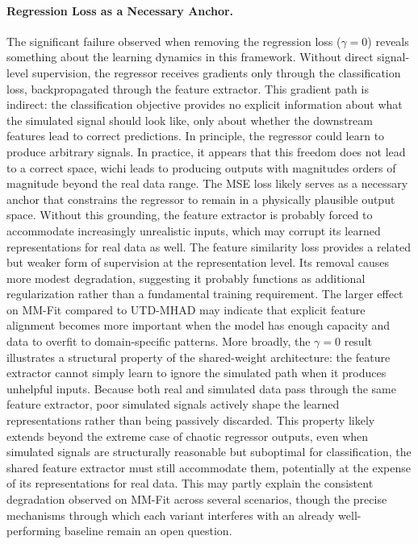 \paragraph{Regression Loss as a Necessary Anchor.}
The significant failure observed when removing the regression loss ($\gamma = 0$) reveals something about the learning dynamics in this framework. Without direct signal-level supervision, the regressor receives gradients only through the classification loss, backpropagated through the feature extractor. This gradient path is indirect: the classification objective provides no explicit information about what the simulated signal should look like, only about whether the downstream features lead to correct predictions. In principle, the regressor could learn to produce arbitrary signals. In practice, it appears that this freedom does not lead to a correct space, wichi leads to producing outputs with magnitudes orders of magnitude beyond the real data range. The MSE loss likely serves as a necessary anchor that constrains the regressor to remain in a physically plausible output space. Without this grounding, the feature extractor is probably forced to accommodate increasingly unrealistic inputs, which may corrupt its learned representations for real data as well. The feature similarity loss provides a related but weaker form of supervision at the representation level. Its removal causes more modest degradation, suggesting it probably functions as additional regularization rather than a fundamental training requirement. The larger effect on MM-Fit compared to UTD-MHAD may indicate that explicit feature alignment becomes more important when the model has enough capacity and data to overfit to domain-specific patterns. More broadly, the $\gamma = 0$ result illustrates a structural property of the shared-weight architecture: the feature extractor cannot simply learn to ignore the simulated path when it produces unhelpful inputs. Because both real and simulated data pass through the same feature extractor, poor simulated signals actively shape the learned representations rather than being passively discarded. This property likely extends beyond the extreme case of chaotic regressor outputs, even when simulated signals are structurally reasonable but suboptimal for classification, the shared feature extractor must still accommodate them, potentially at the expense of its representations for real data. This may partly explain the consistent degradation observed on MM-Fit across several scenarios, though the precise mechanisms through which each variant interferes with an already well-performing baseline remain an open question.

